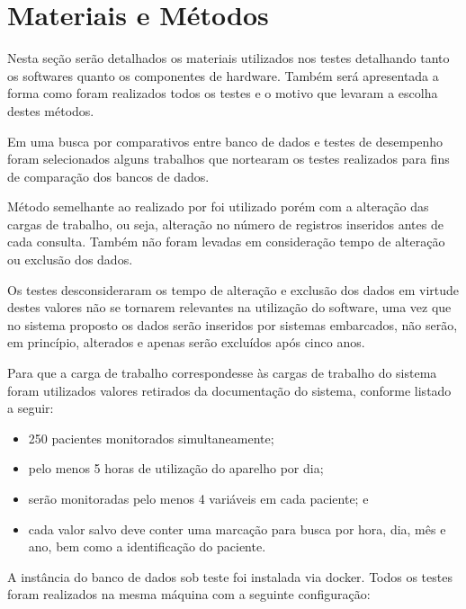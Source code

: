 \documentclass[conference,harvard,brazil,english]{sbatex}
\begin{document}
\section{Materiais e Métodos}
\label{sec:metodos}

Nesta seção serão detalhados os materiais utilizados nos testes detalhando tanto os  softwares quanto os componentes de hardware. Também será apresentada a forma como foram realizados todos os testes e o motivo que levaram a escolha destes métodos.

Em uma busca por comparativos entre banco de dados e testes de desempenho foram selecionados alguns trabalhos que nortearam os testes realizados para fins de comparação dos bancos de dados.

Método semelhante ao realizado por \cite{ferreira2015analise} foi utilizado porém com a alteração das cargas de trabalho, ou seja, alteração no número de registros inseridos antes de cada consulta. Também não foram levadas em consideração tempo de alteração ou exclusão dos dados.

Os testes desconsideraram os tempo de alteração e exclusão dos dados em virtude destes valores não se tornarem relevantes na utilização do software, uma vez que no sistema proposto os dados serão inseridos por sistemas embarcados, não serão, em princípio, alterados e apenas serão excluídos após cinco anos.





Para que a carga de trabalho correspondesse às cargas de trabalho do sistema foram utilizados valores retirados da documentação do sistema, conforme listado a seguir:
\begin{itemize}
    \item 250 pacientes monitorados simultaneamente;
    \item pelo menos 5 horas de utilização do aparelho por dia; 
    \item serão monitoradas pelo menos 4 variáveis em cada paciente;
    e
    \item cada valor salvo deve conter uma marcação para busca por hora, dia, mês e ano, bem como a identificação do paciente.
\end{itemize}



A instância do banco de dados sob teste foi instalada via docker. Todos os testes foram realizados na mesma máquina com a seguinte configuração:
\end{document}
